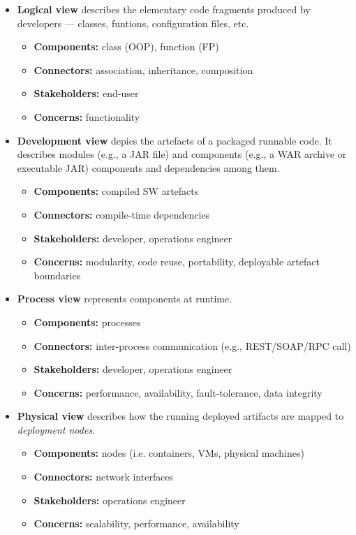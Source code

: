 \documentclass[thesis=M,english,hidelinks]{FITthesis}[2012/10/20]
\begin{document}
\begin{itemize}
    \item \textbf{Logical view} describes the elementary code fragments produced by developers --- classes, funtions, configuration files, etc.
    \begin{itemize}
        \item \textbf{Components:} class (\acrshort{OOP}), function (\acrshort{FP})
        \item \textbf{Connectors:} association, inheritance, composition
        \item \textbf{Stakeholders:} end-user
        \item \textbf{Concerns:} functionality
    \end{itemize}
    
    \item \textbf{Development view} depics the artefacts of a packaged runnable code. It describes modules (e.g., a JAR file) and components (e.g., a WAR archive or executable JAR) components and dependencies among them.
    \begin{itemize}
        \item \textbf{Components:} compiled \acrshort{SW} artefacts
        \item \textbf{Connectors:} compile-time dependencies
        \item \textbf{Stakeholders:} developer, operations engineer
        \item \textbf{Concerns:} modularity, code reuse, portability, deployable artefact boundaries
    \end{itemize}
    
    \item \textbf{Process view} represents components at runtime.
    \begin{itemize}
        \item \textbf{Components:} processes
        \item \textbf{Connectors:} inter-process communication (e.g., \acrshort{REST}/\acrshort{SOAP}/\acrshort{RPC} call) 
        \item \textbf{Stakeholders:} developer, operations engineer
        \item \textbf{Concerns:} performance, availability, fault-tolerance, data integrity
    \end{itemize}
    
    \item \textbf{Physical view} describes how the running deployed artifacts are mapped to \textit{deployment nodes}.
    \begin{itemize}
        \item \textbf{Components:} nodes (i.e. containers, \acrshort{VM}s, physical machines)
        \item \textbf{Connectors:} network interfaces
        \item \textbf{Stakeholders:} operations engineer
        \item \textbf{Concerns:} scalability, performance, availability
    \end{itemize}
    

\end{itemize}
\end{document}
